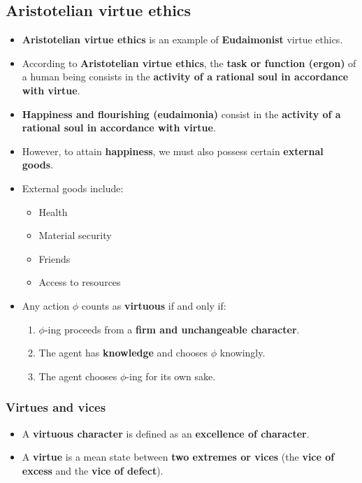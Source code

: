 \documentclass[11pt]{article}
\begin{document}
\subsection{Aristotelian virtue ethics}
\label{sec:orged9abc0}
\begin{itemize}
\item \textbf{Aristotelian virtue ethics} is an example of \textbf{Eudaimonist} virtue ethics.
\item According to \textbf{Aristotelian virtue ethics}, the \textbf{task or function (ergon)} of a human being consists in the \textbf{activity of a rational soul in accordance with virtue}.
\item \textbf{Happiness and flourishing (eudaimonia)} consist in the \textbf{activity of a rational soul in accordance with virtue}.
\item However, to attain \textbf{happiness}, we must also possess certain \textbf{external goods}.
\item External goods include:
\begin{itemize}
\item Health
\item Material security
\item Friends
\item Access to resources
\end{itemize}
\item Any action \(\phi\) counts as \textbf{virtuous} if and only if:
\begin{enumerate}
\item \(\phi\)-ing proceeds from a \textbf{firm and unchangeable character}.
\item The agent has \textbf{knowledge} and chooses \(\phi\) knowingly.
\item The agent chooses \(\phi\)-ing for its own sake.
\end{enumerate}
\end{itemize}
\subsubsection{Virtues and vices}
\label{sec:org7911c0f}
\begin{itemize}
\item A \textbf{virtuous character} is defined as an \textbf{excellence of character}.
\item A \textbf{virtue} is a mean state between \textbf{two extremes or vices} (the \textbf{vice of excess} and the \textbf{vice of defect}).
\end{itemize}
\end{document}
